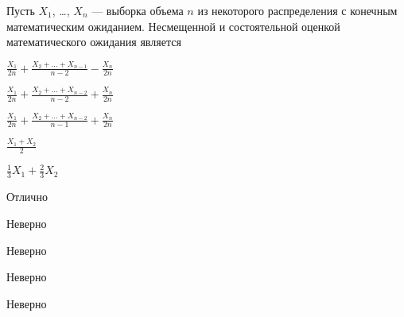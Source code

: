 
\begin{question}
Пусть \(X_1\), \ldots, \(X_n\) — выборка объема \(n\) из некоторого
распределения с конечным математическим ожиданием. Несмещенной и
состоятельной оценкой математического ожидания является
\begin{answerlist}
  \item \(\frac{X_1}{2 n}+\frac{X_2+\ldots+X_{n-1}}{n-2}-\frac{X_n}{2 n}\)
  \item \(\frac{X_1}{2 n}+\frac{X_2+\ldots+X_{n-2}}{n-2}+\frac{X_n}{2 n}\)
  \item \(\frac{X_1}{2 n}+\frac{X_2+\ldots+X_{n-2}}{n-1}+\frac{X_n}{2 n}\)
  \item \(\frac{X_1+X_2}{2}\)
  \item \(\frac{1}{3} X_1 + \frac{2}{3} X_2\)
\end{answerlist}
\end{question}

\begin{solution}
\begin{answerlist}
  \item Отлично
  \item Неверно
  \item Неверно
  \item Неверно
  \item Неверно
\end{answerlist}
\end{solution}


